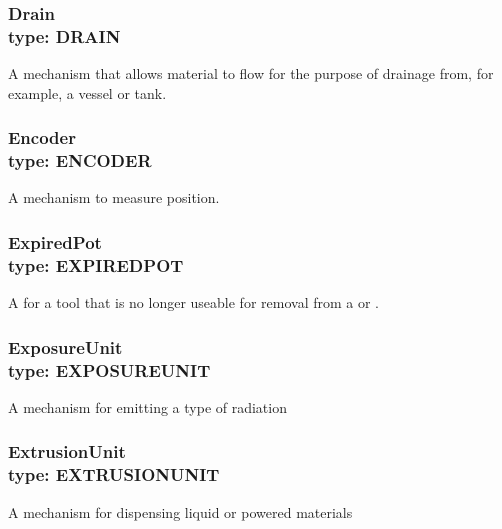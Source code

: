 \subsubsection[Drain]{Drain \\ {\small type: DRAIN}}
\label{sec:Drain}



A mechanism that allows material to flow for the purpose of drainage from, for example, a vessel or tank.



\subsubsection[Encoder]{Encoder \\ {\small type: ENCODER}}
\label{sec:Encoder}



A mechanism to measure position.



\subsubsection[ExpiredPot]{ExpiredPot \\ {\small type: EXPIRED\textunderscore POT}}
\label{sec:ExpiredPot}



A  for a tool that is no longer useable for removal from a  or .



\subsubsection[ExposureUnit]{ExposureUnit \\ {\small type: EXPOSURE\textunderscore UNIT}}
\label{sec:ExposureUnit}



A mechanism for emitting a type of radiation



\subsubsection[ExtrusionUnit]{ExtrusionUnit \\ {\small type: EXTRUSION\textunderscore UNIT}}
\label{sec:ExtrusionUnit}



A mechanism for dispensing liquid or powered materials



